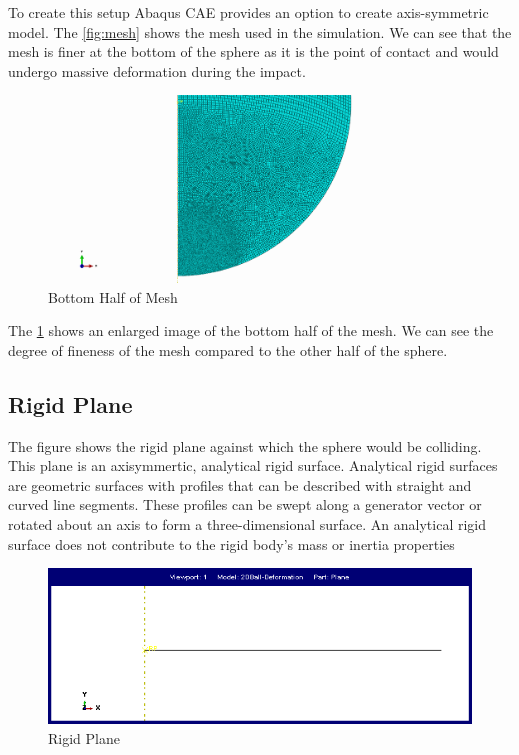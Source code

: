 To create this setup Abaqus CAE provides an option to create axis-symmetric model. The \ref{fig:mesh} shows the mesh used in the simulation. We can see that the mesh is finer at the bottom of the sphere as it is the point of contact and would undergo massive deformation during the impact. 


\begin{figure}[H]
    \centering
	\includegraphics[scale=0.075]{../images/Mesh/Mesh_Bottom_Half_lowRes.png}
	\caption{Bottom Half of Mesh}
	\label{fig:mesh_bottom_half}
\end{figure}

The \ref{fig:mesh_bottom_half} shows an enlarged image of the bottom half of the mesh. We can see the degree of fineness of the mesh compared to the other half of the sphere.


\subsection{Rigid Plane}

The figure shows the rigid plane against which the sphere would be colliding. This plane is an axisymmertic, analytical rigid surface.
Analytical rigid surfaces are geometric surfaces with profiles that can be described with straight and curved line segments. These profiles can be swept along a generator vector or rotated about an axis to form a three-dimensional surface. An analytical rigid surface does not contribute to the rigid body's mass or inertia properties 

\begin{figure}[H]
    \centering
	\includegraphics[scale=0.25]{../images/SimulationSetup/Plane.png}
	\caption{Rigid Plane}
	\label{fig:plane}
\end{figure}


